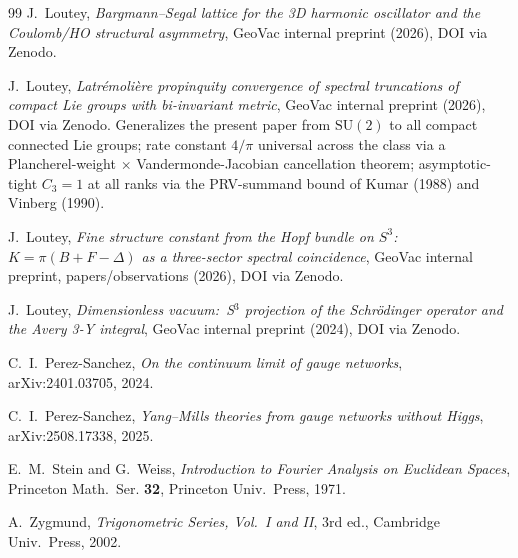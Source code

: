 \documentclass[11pt,a4paper]{article}
\theoremstyle{plain}
\theoremstyle{definition}
\newcommand{\SU}{\mathrm{SU}}
\begin{document}
\begin{thebibliography}{99}
J.~Loutey,
\newblock \emph{Bargmann--Segal lattice for the 3D harmonic oscillator
and the Coulomb/HO structural asymmetry},
\newblock GeoVac internal preprint (2026), DOI via Zenodo.

J.~Loutey,
\newblock \emph{Latr\'emoli\`ere propinquity convergence of spectral
truncations of compact Lie groups with bi-invariant metric},
\newblock GeoVac internal preprint (2026), DOI via Zenodo.
\newblock Generalizes the present paper from $\SU(2)$ to all compact
connected Lie groups; rate constant $4/\pi$ universal across the class
via a Plancherel-weight $\times$ Vandermonde-Jacobian cancellation
theorem; asymptotic-tight $C_3 = 1$ at all ranks via the PRV-summand
bound of Kumar (1988) and Vinberg (1990).

J.~Loutey,
\newblock \emph{Fine structure constant from the Hopf bundle on $S^3$:
$K = \pi(B + F - \Delta)$ as a three-sector spectral coincidence},
\newblock GeoVac internal preprint, papers/observations (2026),
DOI via Zenodo.

J.~Loutey,
\newblock \emph{Dimensionless vacuum:\ S$^3$ projection of the
Schr\"odinger operator and the Avery 3-Y integral},
\newblock GeoVac internal preprint (2024), DOI via Zenodo.

C.~I.~Perez-Sanchez,
\newblock \emph{On the continuum limit of gauge networks},
\newblock arXiv:2401.03705, 2024.

C.~I.~Perez-Sanchez,
\newblock \emph{Yang--Mills theories from gauge networks without
Higgs},
\newblock arXiv:2508.17338, 2025.

E.~M.~Stein and G.~Weiss,
\newblock \emph{Introduction to Fourier Analysis on Euclidean Spaces},
\newblock Princeton Math.~Ser. \textbf{32}, Princeton Univ.~Press, 1971.

A.~Zygmund,
\newblock \emph{Trigonometric Series, Vol.~I and II},
\newblock 3rd ed., Cambridge Univ.~Press, 2002.

\end{thebibliography}
\end{document}
